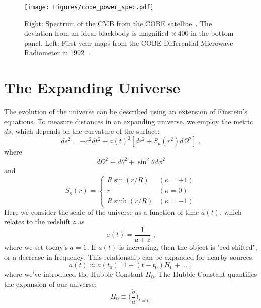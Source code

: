 \begin{figure}[t]
    \centering
    \texttt{[image: Figures/cobe\_power\_spec.pdf]}
    \caption{Right: Spectrum of the CMB from the COBE satellite~\cite{1994ApJ...420..439M}.  The deviation from an ideal blackbody is magnified $\times\,400$ in the bottom panel.  Left: First-year maps from the COBE Differential Microwave Radiometer in 1992~\cite{1992ApJ...396L...1S}.}
    \label{fig:cobe_power_spectra}
\end{figure}

\section{The Expanding Universe}
The evolution of the universe can be described using an extension of Einstein's equations.  To measure distances in an expanding universe, we employ the metric $ds$, which depends on the curvature of the surface:
\begin{equation}
    ds^2 = -c^2dt^2 + a(t)^2[dr^2 + S_\kappa (r^2)d\Omega^2]\text{ ,}
\end{equation}
where
\begin{equation}
    d\Omega^2\equiv d\theta^2 + \sin^2\theta d\phi^2
\end{equation}
and
\begin{equation}
    S_\kappa(r) = \begin{cases} R\sin(r/R) & (\kappa = +1) \\
  r & (\kappa = 0) \\
   R\sinh(r/R) & (\kappa = -1)\end{cases}
\end{equation}
Here we consider the scale of the universe as a function of time $a(t)$, which relates to the redshift $z$ as
\begin{equation}
    a(t) = \frac{1}{a+z}\text{ ,}
\end{equation}
where we set today's $a=1$.  If $a(t)$ is increasing, then the object is "red-shifted", or a decrease in frequency.  This relationship can be expanded for nearby sources:
\begin{equation}
    a(t)\approx a(t_0)[1+(t-t_0)H_0+ \ldots ]
\end{equation}
where we've introduced the Hubble Constant $H_0$.  The Hubble Constant quantifies the expansion of our universe:
\begin{equation}
    H_0\equiv \bigg(\frac{\dot{a}}{a}\bigg )_{t=t_0}
\end{equation}

